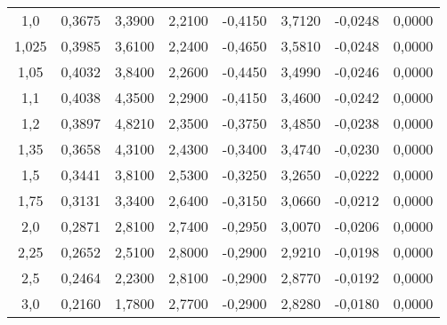\begin{table}[ht]
\begin{tabular}{c|c|c|c|c|c|c|c}
1,0   & 0,3675  & 3,3900 & 2,2100 & -0,4150 & 3,7120 & -0,0248 & 0,0000 \\
1,025 & 0,3985  & 3,6100 & 2,2400 & -0,4650 & 3,5810 & -0,0248 & 0,0000 \\
1,05  & 0,4032  & 3,8400 & 2,2600 & -0,4450 & 3,4990 & -0,0246 & 0,0000 \\
1,1   & 0,4038  & 4,3500 & 2,2900 & -0,4150 & 3,4600 & -0,0242 & 0,0000 \\
1,2   & 0,3897  & 4,8210 & 2,3500 & -0,3750 & 3,4850 & -0,0238 & 0,0000 \\
1,35  & 0,3658  & 4,3100 & 2,4300 & -0,3400 & 3,4740 & -0,0230 & 0,0000 \\
1,5   & 0,3441  & 3,8100 & 2,5300 & -0,3250 & 3,2650 & -0,0222 & 0,0000 \\
1,75  & 0,3131  & 3,3400 & 2,6400 & -0,3150 & 3,0660 & -0,0212 & 0,0000 \\
2,0   & 0,2871  & 2,8100 & 2,7400 & -0,2950 & 3,0070 & -0,0206 & 0,0000 \\
2,25  & 0,2652  & 2,5100 & 2,8000 & -0,2900 & 2,9210 & -0,0198 & 0,0000 \\
2,5   & 0,2464  & 2,2300 & 2,8100 & -0,2900 & 2,8770 & -0,0192 & 0,0000 \\
3,0   & 0,2160  & 1,7800 & 2,7700 & -0,2900 & 2,8280 & -0,0180 & 0,0000
\end{tabular}
\label{tab:apendice-coeficientes-bb-1pol-0030}
\end{table}